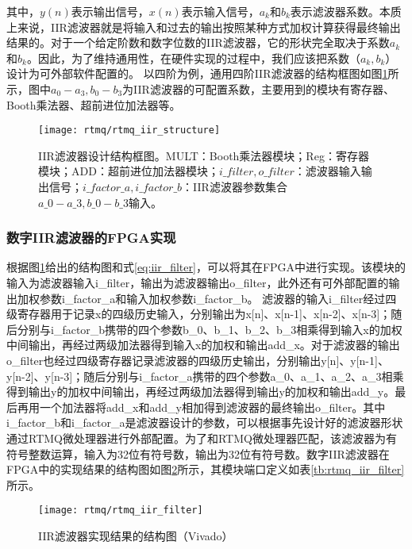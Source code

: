 其中，$y(n)$表示输出信号，$x(n)$表示输入信号，$a_k$和$b_k$表示滤波器系数。本质上来说，IIR滤波器就是将输入和过去的输出按照某种方式加权计算获得最终输出结果的。对于一个给定阶数和数字位数的IIR滤波器，它的形状完全取决于系数$a_k$和$b_k$。因此，为了维持通用性，在硬件实现的过程中，我们应该把系数（$a_k, b_k$）设计为可外部软件配置的。
以四阶为例，通用四阶IIR滤波器的结构框图如图\ref{fig:rtmq_iir_structure}所示，图中$a_0-a_3, b_0-b_3$为IIR滤波器的可配置系数，主要用到的模块有寄存器、Booth乘法器、超前进位加法器等。
\begin{figure}
    \centering
    \texttt{[image: rtmq/rtmq\_iir\_structure]}
    \caption[IIR滤波器设计结构框图]{IIR滤波器设计结构框图。MULT：Booth乘法器模块；Reg：寄存器模块；ADD：超前进位加法器模块；$i\_filter, o\_filter$：滤波器输入输出信号；$i\_factor\_a,i\_factor\_b$：IIR滤波器参数集合$a\_0-a\_3, b\_0-b\_3$输入。\label{fig:rtmq_iir_structure}}
\end{figure}


\subsubsection[高速通用数字IIR滤波器的FPGA实现]{数字IIR滤波器的FPGA实现}

根据图\ref{fig:rtmq_iir_structure}给出的结构图和式\eqref{eq:iir_filter}，可以将其在FPGA中进行实现。该模块的输入为滤波器输入i\_filter，输出为滤波器输出o\_filter，此外还有可外部配置的输出加权参数i\_factor\_a和输入加权参数i\_factor\_b。
滤波器的输入i\_filter经过四级寄存器用于记录x的四级历史输入，分别输出为x[n]、x[n-1]、x[n-2]、x[n-3]；随后分别与i\_factor\_b携带的四个参数b\_0、b\_1、b\_2、b\_3相乘得到输入x的加权中间输出，再经过两级加法器得到输入x的加权和输出add\_x。对于滤波器的输出o\_filter也经过四级寄存器记录滤波器的四级历史输出，分别输出y[n]、y[n-1]、y[n-2]、y[n-3]；随后分别与i\_factor\_a携带的四个参数a\_0、a\_1、a\_2、a\_3相乘得到输出y的加权中间输出，再经过两级加法器得到输出y的加权和输出add\_y。最后再用一个加法器将add\_x和add\_y相加得到滤波器的最终输出o\_filter。其中i\_factor\_b和i\_factor\_a是滤波器设计的参数，可以根据事先设计好的滤波器形状通过RTMQ微处理器进行外部配置。为了和RTMQ微处理器匹配，该滤波器为有符号整数运算，输入为32位有符号数，输出为32位有符号数。数字IIR滤波器在FPGA中的实现结果的结构图如图\ref{fig:iir_filter_vivado}所示，其模块端口定义如表\ref{tb:rtmq_iir_filter}所示。

\begin{figure}
    \centering
    \texttt{[image: rtmq/rtmq\_iir\_filter]}
    \caption[IIR滤波器实现结果的结构图]{IIR滤波器实现结果的结构图（Vivado）\label{fig:iir_filter_vivado}}
\end{figure}

